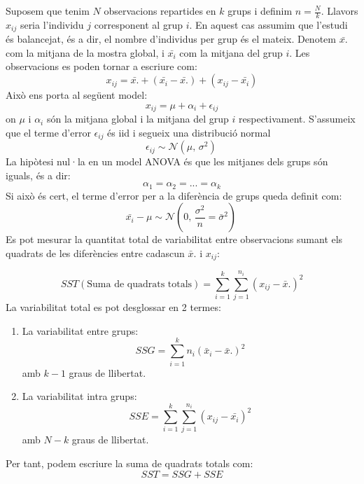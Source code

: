 \documentclass[english]{article}
\begin{document}
Suposem que tenim $N$ observacions repartides en $k$ grups i definim $n=\frac{N}{k}$. Llavors $x_{ij}$ seria l'individu $j$ corresponent al grup $i$. En aquest cas assumim que l'estudi és balancejat, és a dir, el nombre d'individus per grup és el mateix. Denotem $\bar{x.}$ com la mitjana de la mostra global, i $\bar{x_{i}}$ com la mitjana del grup $i$.
Les observacions es poden tornar a escriure com:
\begin{equation*}
x_{ij} = \bar{x.} + (\bar{x_{i}} - \bar{x.}) + (x_{ij} - \bar{x_{i}})
\end{equation*}
Això ens porta al següent model:
\begin{equation*}
x_{ij} = \mu + \alpha_{i} + \epsilon_{ij}
\end{equation*}
on $\mu$ i $\alpha_{i}$ són la mitjana global i la mitjana del grup $i$ respectivament. S'assumeix que el terme d'error $\epsilon_{ij}$ és iid i segueix una distribució normal
\begin{equation*}
\epsilon_{ij} \sim \mathcal{N}(\mu,\,\sigma^{2})\,
\end{equation*}
La hipòtesi nul·la en un model ANOVA és que les mitjanes dels grups són iguals, és a dir:
\begin{equation*}
\alpha_1 = \alpha_2 = ... = \alpha_k
\end{equation*}
Si això és cert, el terme d'error per a la diferència de grups queda definit com:
\begin{equation*}
\bar{x_{i}} - \mu \sim \mathcal{N}(0,\,\frac{\sigma^{2}}{n}=\bar{\sigma}^2)\,
\end{equation*}
Es pot mesurar la quantitat total de variabilitat entre observacions sumant els quadrats de les diferències entre cadascun $\bar{x}.$ i $x_{ij}$:

\begin{equation*}
SST(\text{Suma de quadrats totals}) = \sum_{i=1}^{k} \sum_{j=1}^{n_{i}} (x_{ij} - \bar{x}.)^2
\end{equation*}
La variabilitat total es pot desglossar en 2 termes:
\begin{enumerate}
\item La variabilitat entre grups:
\begin{equation*}
SSG = \sum_{i=1}^{k} n_{i}(\bar{x}_{i} - \bar{x}.)^2
\end{equation*}
amb $k-1$ graus de llibertat.
\item La variabilitat intra grups:
\begin{equation*}
SSE = \sum_{i=1}^{k} \sum_{j=1}^{n_{i}} (x_{ij} - \bar{x_{i}})^2
\end{equation*}
amb $N-k$ graus de llibertat.
\end{enumerate}
Per tant, podem escriure la suma de quadrats totals com:
\begin{equation*}
SST = SSG + SSE
\end{equation*}
\end{document}
